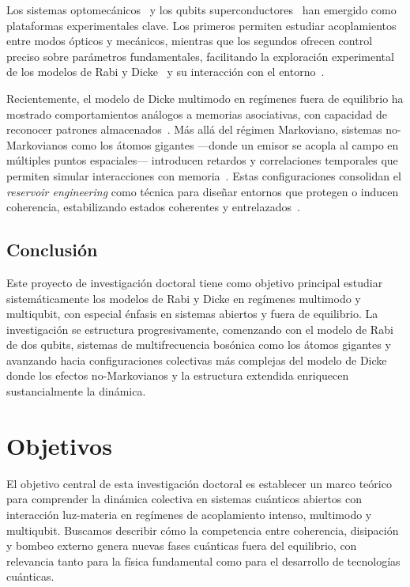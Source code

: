 \documentclass[onecolumn,notitlepage,letterpaper,aps,pra,12pt]{article}
\numberwithin{equation}{section}
\begin{document}
Los sistemas optomecánicos~\cite{debnath2015} y los qubits superconductores~\cite{Lamata2017} han emergido como plataformas experimentales clave. Los primeros permiten estudiar acoplamientos entre modos ópticos y mecánicos, mientras que los segundos ofrecen control preciso sobre parámetros fundamentales, facilitando la exploración experimental de los modelos de Rabi y Dicke~\cite{Mezzacapo14} y su interacción con el entorno~\cite{hwang2018,Lo2021}.

Recientemente, el modelo de Dicke multimodo en regímenes fuera de equilibrio ha mostrado comportamientos análogos a memorias asociativas, con capacidad de reconocer patrones almacenados~\cite{fiorelli2020}. Más allá del régimen Markoviano, sistemas no-Markovianos como los átomos gigantes —donde un emisor se acopla al campo en múltiples puntos espaciales— introducen retardos y correlaciones temporales que permiten simular interacciones con memoria~\cite{kockum2019,guo2020}. Estas configuraciones consolidan el \textit{reservoir engineering} como técnica para diseñar entornos que protegen o inducen coherencia, estabilizando estados coherentes y entrelazados~\cite{poyatos1996,Diehl2008}.


\subsection{Conclusión}

Este proyecto de investigación doctoral tiene como objetivo principal estudiar sistemáticamente los modelos de Rabi y Dicke en regímenes multimodo y multiqubit, con especial énfasis en sistemas abiertos y fuera de equilibrio. La investigación se estructura progresivamente, comenzando con el modelo de Rabi de dos qubits, sistemas de multifrecuencia bosónica como los átomos gigantes y  avanzando hacia configuraciones colectivas más complejas del modelo de Dicke  donde los efectos no-Markovianos y la estructura  extendida enriquecen sustancialmente la dinámica.



\section{Objetivos}

El objetivo central de esta investigación doctoral es establecer un marco teórico para comprender la dinámica colectiva en sistemas cuánticos abiertos con interacción luz-materia en regímenes de acoplamiento intenso, multimodo y multiqubit. Buscamos describir cómo la competencia entre coherencia, disipación y bombeo externo genera nuevas fases cuánticas fuera del equilibrio, con relevancia tanto para la física fundamental como para el desarrollo de tecnologías cuánticas.
\end{document}
